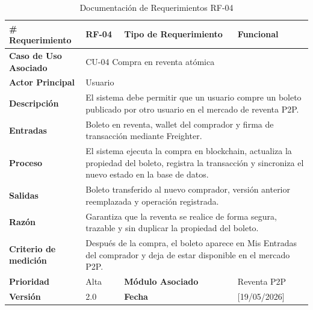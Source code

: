 \documentclass[12pt,letterpaper]{article}
\begin{document}
\begin{table}[H]
\centering
\scriptsize
\renewcommand{\arraystretch}{1.05}
\setlength{\tabcolsep}{3pt}

\newlength{\anchoceldaRFcuatro}
\setlength{\anchoceldaRFcuatro}{\dimexpr\textwidth-2.7cm-8\tabcolsep-5\arrayrulewidth\relax}

\begin{tabularx}{\textwidth}{|p{2.7cm}|X|p{2.8cm}|X|}
\hline
\textbf{\# Requerimiento} & RF-04 & \textbf{Tipo de Requerimiento} & Funcional \\ \hline

\textbf{Caso de Uso Asociado} & 
\multicolumn{3}{p{\anchoceldaRFcuatro}|}{CU-04 Compra en reventa atómica} \\ \hline

\textbf{Actor Principal} & 
\multicolumn{3}{p{\anchoceldaRFcuatro}|}{Usuario} \\ \hline

\textbf{Descripción} & 
\multicolumn{3}{p{\anchoceldaRFcuatro}|}{El sistema debe permitir que un usuario compre un boleto publicado por otro usuario en el mercado de reventa P2P.} \\ \hline

\textbf{Entradas} & 
\multicolumn{3}{p{\anchoceldaRFcuatro}|}{Boleto en reventa, wallet del comprador y firma de transacción mediante Freighter.} \\ \hline

\textbf{Proceso} & 
\multicolumn{3}{p{\anchoceldaRFcuatro}|}{El sistema ejecuta la compra en blockchain, actualiza la propiedad del boleto, registra la transacción y sincroniza el nuevo estado en la base de datos.} \\ \hline

\textbf{Salidas} & 
\multicolumn{3}{p{\anchoceldaRFcuatro}|}{Boleto transferido al nuevo comprador, versión anterior reemplazada y operación registrada.} \\ \hline

\textbf{Razón} & 
\multicolumn{3}{p{\anchoceldaRFcuatro}|}{Garantiza que la reventa se realice de forma segura, trazable y sin duplicar la propiedad del boleto.} \\ \hline

\textbf{Criterio de medición} & 
\multicolumn{3}{p{\anchoceldaRFcuatro}|}{Después de la compra, el boleto aparece en Mis Entradas del comprador y deja de estar disponible en el mercado P2P.} \\ \hline

\textbf{Prioridad} & Alta & \textbf{Módulo Asociado} & Reventa P2P \\ \hline

\textbf{Versión} & 2.0 & \textbf{Fecha} & [19/05/2026] \\ \hline

\end{tabularx}

\caption{Documentación de Requerimientos RF-04}
\label{tab:documentacion_requerimientos_rf04}
\normalsize
\end{table}
\end{document}
